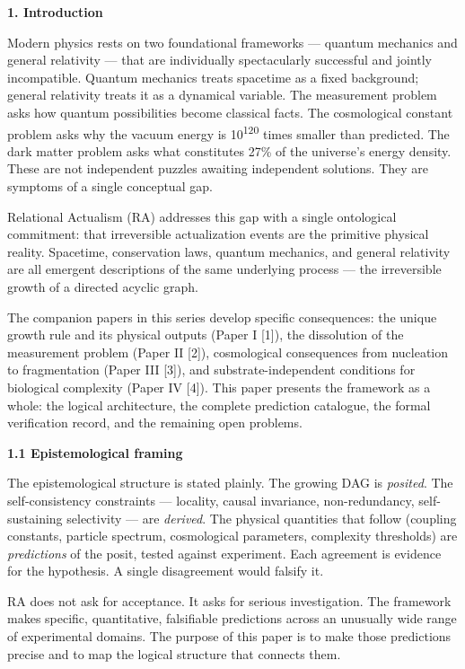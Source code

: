 \documentclass[12pt,a4paper]{article}
\begin{document}
\textbf{1. Introduction}

Modern physics rests on two foundational frameworks --- quantum
mechanics and general relativity --- that are individually spectacularly
successful and jointly incompatible. Quantum mechanics treats spacetime
as a fixed background; general relativity treats it as a dynamical
variable. The measurement problem asks how quantum possibilities become
classical facts. The cosmological constant problem asks why the vacuum
energy is 10\textsuperscript{120} times smaller than predicted. The dark
matter problem asks what constitutes 27\% of the universe's energy
density. These are not independent puzzles awaiting independent
solutions. They are symptoms of a single conceptual gap.

Relational Actualism (RA) addresses this gap with a single ontological
commitment: that irreversible actualization events are the primitive
physical reality. Spacetime, conservation laws, quantum mechanics, and
general relativity are all emergent descriptions of the same underlying
process --- the irreversible growth of a directed acyclic graph.

The companion papers in this series develop specific consequences: the
unique growth rule and its physical outputs (Paper I {[}1{]}), the
dissolution of the measurement problem (Paper II {[}2{]}), cosmological
consequences from nucleation to fragmentation (Paper III {[}3{]}), and
substrate-independent conditions for biological complexity (Paper IV
{[}4{]}). This paper presents the framework as a whole: the logical
architecture, the complete prediction catalogue, the formal verification
record, and the remaining open problems.

\textbf{1.1 Epistemological framing}

The epistemological structure is stated plainly. The growing DAG is
\emph{posited}. The self-consistency constraints --- locality, causal
invariance, non-redundancy, self-sustaining selectivity --- are
\emph{derived}. The physical quantities that follow (coupling constants,
particle spectrum, cosmological parameters, complexity thresholds) are
\emph{predictions} of the posit, tested against experiment. Each
agreement is evidence for the hypothesis. A single disagreement would
falsify it.

RA does not ask for acceptance. It asks for serious investigation. The
framework makes specific, quantitative, falsifiable predictions across
an unusually wide range of experimental domains. The purpose of this
paper is to make those predictions precise and to map the logical
structure that connects them.
\end{document}
